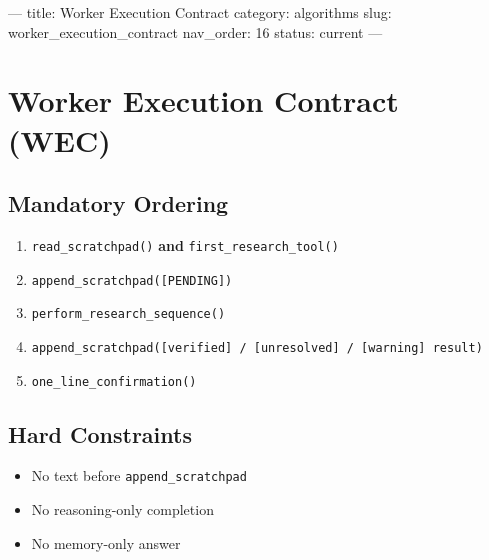 ---
title: Worker Execution Contract
category: algorithms
slug: worker_execution_contract
nav_order: 16
status: current
---

\section{Worker Execution Contract (WEC)}

\subsection*{Mandatory Ordering}

\begin{enumerate}
    \item \texttt{read\_scratchpad()} \textbf{and} \texttt{first\_research\_tool()}
    \item \texttt{append\_scratchpad([PENDING])}
    \item \texttt{perform\_research\_sequence()}
    \item \texttt{append\_scratchpad([verified] / [unresolved] / [warning] result)}
    \item \texttt{one\_line\_confirmation()}
\end{enumerate}

\subsection*{Hard Constraints}

\begin{itemize}
    \item No text before \texttt{append\_scratchpad}
    \item No reasoning-only completion
    \item No memory-only answer
\end{itemize}